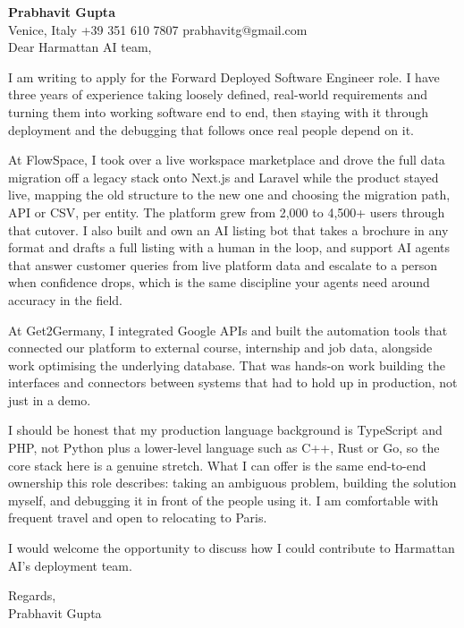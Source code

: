 \documentclass[a4paper,10.5pt]{article}
\begin{document}
\textbf{Prabhavit Gupta}\\
Venice, Italy \textbar{} +39 351 610 7807 \textbar{} prabhavitg@gmail.com\\[10pt]
Dear Harmattan AI team,

I am writing to apply for the Forward Deployed Software Engineer role. I have three years of experience taking loosely defined, real-world requirements and turning them into working software end to end, then staying with it through deployment and the debugging that follows once real people depend on it.

At FlowSpace, I took over a live workspace marketplace and drove the full data migration off a legacy stack onto Next.js and Laravel while the product stayed live, mapping the old structure to the new one and choosing the migration path, API or CSV, per entity. The platform grew from 2,000 to 4,500+ users through that cutover. I also built and own an AI listing bot that takes a brochure in any format and drafts a full listing with a human in the loop, and support AI agents that answer customer queries from live platform data and escalate to a person when confidence drops, which is the same discipline your agents need around accuracy in the field.

At Get2Germany, I integrated Google APIs and built the automation tools that connected our platform to external course, internship and job data, alongside work optimising the underlying database. That was hands-on work building the interfaces and connectors between systems that had to hold up in production, not just in a demo.

I should be honest that my production language background is TypeScript and PHP, not Python plus a lower-level language such as C++, Rust or Go, so the core stack here is a genuine stretch. What I can offer is the same end-to-end ownership this role describes: taking an ambiguous problem, building the solution myself, and debugging it in front of the people using it. I am comfortable with frequent travel and open to relocating to Paris.

I would welcome the opportunity to discuss how I could contribute to Harmattan AI's deployment team.

Regards,\\
Prabhavit Gupta
\end{document}
